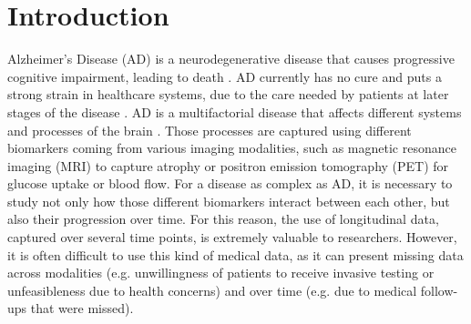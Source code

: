 \section{Introduction}

Alzheimer's Disease (AD) is a neurodegenerative disease that causes progressive cognitive impairment, leading to death \cite{Lane2018}. AD currently has no cure and puts a strong strain in healthcare systems, due to the care needed by patients at later stages of the disease \cite{AlzheimersAssociation}. AD is a multifactorial disease that affects different systems and processes of the brain \cite{Jack2010}. Those processes are captured using different biomarkers coming from various imaging modalities, such as magnetic resonance imaging (MRI) to capture atrophy or positron emission tomography (PET) for glucose uptake or blood flow. For a disease as complex as AD, it is necessary to study not only how those different biomarkers interact between each other, but also their progression over time. For this reason, the use of longitudinal data, captured over several time points, is extremely valuable to researchers. However, it is often difficult to use this kind of medical data, as it can present missing data across modalities (e.g. unwillingness of  patients to receive invasive testing or unfeasibleness due to health concerns) and over time (e.g. due to medical follow-ups that were missed). \\

